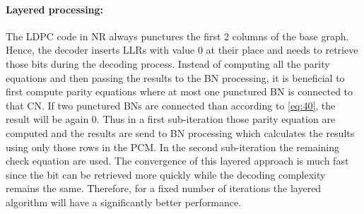 \documentclass{article}
\begin{document}
\paragraph{Layered processing:}
The LDPC code in NR always punctures the first 2 columns of the base graph. Hence, the decoder inserts LLRs with value 0 at their place and needs to retrieve those bits during the decoding process. Instead of computing all the parity equations and then passing the results to the BN processing, it is beneficial to first compute parity equations where at most one punctured BN is connected to that CN. If two punctured BNs are connected than according to \eqref{eq:40}, the result will be again 0. Thus in a first sub-iteration those parity equation are computed and the results are send to BN processing which calculates the results using only those rows in the PCM. In the second sub-iteration the remaining check equation are used.
The convergence of this layered approach is much fast since the bit can be retrieved more quickly while the decoding complexity remains the same. Therefore, for a fixed number of iterations the layered algorithm will have a significantly better performance.

\newpage


\end{document}

